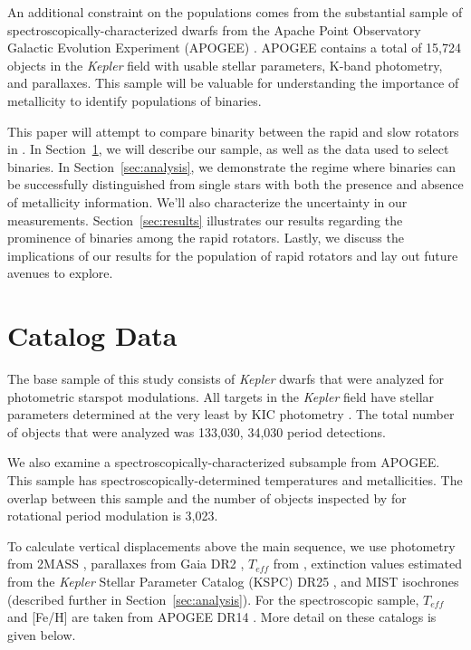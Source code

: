 \documentclass[manuscript]{aastex6}
\newcommand{\Kepler}{\mbox{\textit{Kepler}}}
\newcommand{\Teff}{\ensuremath{T_{eff}}}
\begin{document}
An additional constraint on the populations comes from the substantial sample
of spectroscopically-characterized dwarfs from the Apache Point Observatory
Galactic Evolution Experiment (APOGEE) \citep{Majewski17}. APOGEE contains a 
total of 15,724 objects in the \Kepler{} field with usable stellar parameters,
K-band photometry, and parallaxes.  This sample will be valuable for 
understanding the importance of metallicity to identify populations of 
binaries.

This paper will attempt to compare binarity between the rapid and slow rotators 
in \citet{McQuillan14}. In Section~\ref{sec:data}, we will describe our 
sample, as well as the data used to select binaries. In Section~\ref{sec:analysis}, we demonstrate the regime where 
binaries can be successfully distinguished from single stars with both the 
presence and absence of metallicity information. We'll also characterize the 
uncertainty in our measurements. Section~\ref{sec:results} illustrates our 
results regarding the prominence of binaries among the rapid rotators. Lastly, 
we discuss the implications of our results for the population of rapid rotators 
and lay out future avenues to explore.

\section{Catalog Data}
\label{sec:data}

The base sample of this study consists of \Kepler{} dwarfs that were analyzed
for photometric starspot modulations. All targets in the \Kepler{} field have 
stellar parameters determined at the very least by KIC photometry 
\citep{Brown11}. The total number of objects that were analyzed was 133,030, 
34,030 period detections.

We also examine a spectroscopically-characterized subsample from APOGEE\@. 
This sample has spectroscopically-determined temperatures and metallicities. 
The overlap between this sample and the number of objects inspected by 
\citet{McQuillan14} for rotational period modulation is 3,023.

To calculate vertical displacements above the main sequence, we use photometry
from 2MASS \citep{Skrutskie06}, parallaxes from Gaia DR2 \citep{Gaia18},
\Teff{} from \citet{Pinsonneault12}, extinction values estimated from the 
\Kepler{} Stellar Parameter Catalog (KSPC) DR25 \citep{Huber14,Mathur17}, and
MIST isochrones \citep{Choi16} (described further in
Section~\ref{sec:analysis}). For the spectroscopic sample, \Teff{} and [Fe/H] 
are taken from APOGEE DR14 \citep{Abolfathi18}. More detail on these catalogs 
is given below.
\end{document}
